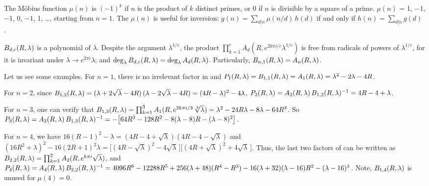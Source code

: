 \documentclass[twocolumn]{revtex4-1}
\begin{document}
\begin{remark}[2]
The M\"obius function $\mu(n)$ is $(-1)^k$
  if $n$ is the product of $k$ distinct primes,
  or 0 if $n$ is divisible by a square of a prime.
$\mu(n)$ = 1, $-1$, $-1$, 0, $-1$, 1, \ldots, starting from $n = 1$.
The $\mu(n)$ is useful for inversion:
$g(n) = \sum_{d|n} \mu(n/d) \, h(d)$
if and only if $h(n) = \sum_{d|n} g(d)$
\cite{hardy}.
\end{remark}

\begin{remark}[3]
$B_{d,c}(R, \lambda)$ is a polynomial of $\lambda$.
Despite the argument $\lambda^{1/c}$,
  the product $\prod_{k=1}^c A_d(R, e^{2k\pi i/c} \lambda^{1/c})$
  is free from radicals of powers of $\lambda^{1/c}$,
  for it is invariant under $\lambda \rightarrow e^{2\pi i} \lambda$;
and $\deg_\lambda B_{d,c}(R, \lambda) = \deg_\lambda A_d(R, \lambda)$.
Particularly, $B_{n,1}(R, \lambda) = A_n(R, \lambda)$.
\end{remark}




Let us see some examples.
%
For $n = 1$,
there is no irrelevant factor
in  and
$P_1(R, \lambda) = B_{1,1}(R, \lambda) = A_1(R, \lambda) = \lambda^2 - 2\lambda - 4R$.



For $n = 2$, since
$B_{1,2}(R, \lambda)
=
(\lambda +2\sqrt{\lambda} - 4R)
\,
(\lambda -2\sqrt{\lambda} - 4R)
=(4R-\lambda)^2 -4\lambda$,
%
$P_2(R, \lambda) = A_2(R, \lambda) \, B_{1,2}(R, \lambda)^{-1} = 4R - 4 + \lambda$.



For $n = 3$,
one can verify that
$B_{1,3}(R, \lambda)
= \prod_{k=1}^3 A_1(R, e^{2k\pi i/3} \, \sqrt[3]{\lambda})
=  \lambda^2 - 24 R \lambda - 8 \lambda - 64 R^3$.
%
So
$P_3(R, \lambda) = A_3(R, \lambda) \, B_{1,3}(R, \lambda)^{-1}
= -\big[64 R^3- 128 R^2 -8(\lambda -8)R-(\lambda-8)^2\big]$.



For $n = 4$,
we have
$16 (R-1)^2 - \lambda
= (4R - 4 + \sqrt{\lambda})(4R - 4 - \sqrt{\lambda})$
and
$
(16 R^2 + \lambda)^2 - 16 (2R+1)^2 \lambda
=
\big[(4R - \sqrt{\lambda})^2  - 4\sqrt{\lambda}\,\big]
\big[(4R + \sqrt{\lambda})^2  + 4\sqrt{\lambda}\,\big]$.
Thus, the last two factors of 
can be written as
$B_{2,2}(R, \lambda) = \prod_{k=1}^2 A_2(R, e^{k \pi i} \sqrt{\lambda})$,
and
%
$P_4(R, \lambda)
    = A_4(R, \lambda) \, B_{2,2}(R, \lambda)^{-1}
    = 4096 R^6-12288 R^5+ 256 (\lambda + 48) (R^4- R^3)
    -16(\lambda + 32)(\lambda - 16) R^2 - (\lambda-16)^3$.
Note, $B_{1,4}(R, \lambda)$ is unused for $\mu(4) = 0$.
\end{document}
